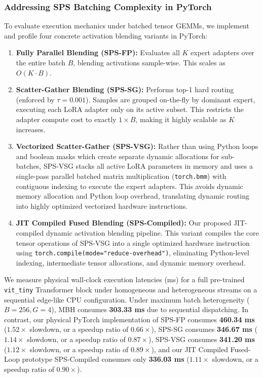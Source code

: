 \subsubsection{Addressing SPS Batching Complexity in PyTorch}
\label{subsec:pytorch_serving}
To evaluate execution mechanics under batched tensor GEMMs, we implement and profile four concrete activation blending variants in PyTorch:
\begin{enumerate}
    \item \textbf{Fully Parallel Blending (SPS-FP):} Evaluates all $K$ expert adapters over the entire batch $B$, blending activations sample-wise. This scales as $O(K \cdot B)$.
    \item \textbf{Scatter-Gather Blending (SPS-SG):} Performs top-1 hard routing (enforced by $\tau = 0.001$).
Samples are grouped on-the-fly by dominant expert, executing each LoRA adapter only on its active subset.
This restricts the adapter compute cost to exactly $1 \times B$, making it highly scalable as $K$ increases.

    \item \textbf{Vectorized Scatter-Gather (SPS-VSG):} Rather than using Python loops and boolean masks which create separate dynamic allocations for sub-batches, SPS-VSG stacks all active LoRA parameters in memory and uses a single-pass parallel batched matrix multiplication (\texttt{torch.bmm}) with contiguous indexing to execute the expert adapters.
This avoids dynamic memory allocation and Python loop overhead, translating dynamic routing into highly optimized vectorized hardware instructions.

    \item \textbf{JIT Compiled Fused Blending (SPS-Compiled):} Our proposed JIT-compiled dynamic activation blending pipeline.
This variant compiles the core tensor operations of SPS-VSG into a single optimized hardware instruction using \texttt{torch.compile(mode="reduce-overhead")}, eliminating Python-level indexing, intermediate tensor allocations, and dynamic memory overhead.

\end{enumerate}

We measure physical wall-clock execution latencies (ms) for a full pre-trained \texttt{vit\_tiny} Transformer block under homogeneous and heterogeneous streams on a sequential edge-like CPU configuration. 
Under maximum batch heterogeneity ($B=256, G=4$), MBH consumes \textbf{303.33 ms} due to sequential dispatching. 
In contrast, our physical PyTorch implementation of SPS-FP consumes \textbf{460.34 ms} ($1.52\times$ slowdown, or a speedup ratio of $0.66\times$), SPS-SG consumes \textbf{346.67 ms} ($1.14\times$ slowdown, or a speedup ratio of $0.87\times$), SPS-VSG consumes \textbf{341.20 ms} ($1.12\times$ slowdown, or a speedup ratio of $0.89\times$), and our JIT Compiled Fused-Loop prototype SPS-Compiled consumes only \textbf{336.03 ms} ($1.11\times$ slowdown, or a speedup ratio of $0.90\times$).


